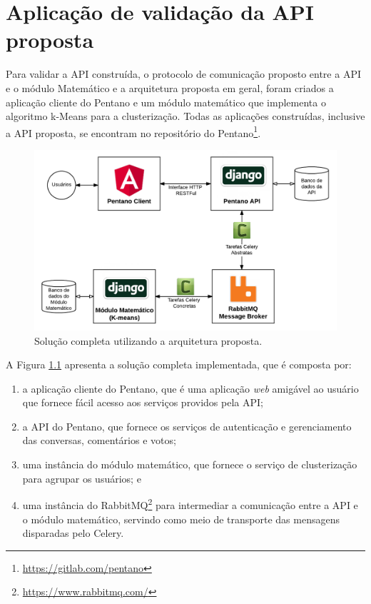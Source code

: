 \chapter{Aplicação de validação da API proposta} \label{cap:aplicacao_exemplo}

  Para validar a API construída, o protocolo de comunicação proposto entre a API e o módulo Matemático
  e a arquitetura proposta em geral, foram criados a aplicação cliente do Pentano e um módulo matemático
  que implementa o algoritmo k-Means para a clusterização.
  Todas as aplicações construídas, inclusive a API proposta, se encontram no repositório do Pentano\footnote{\href{https://gitlab.com/pentano}{https://gitlab.com/pentano}}.
  
  \begin{figure}[h!]
    \centering
    \includegraphics[scale=0.4]{figuras/whole_solution.png}
    \caption{Solução completa utilizando a arquitetura proposta.}
    \label{fig:whole_solution}
  \end{figure}
  
  A Figura \ref{fig:whole_solution} apresenta a solução completa implementada, que
  é composta por:
  
  \begin{enumerate}
      \item a aplicação cliente do Pentano, que é uma aplicação \textit{web} amigável ao usuário que fornece 
      fácil acesso aos serviços providos pela API;
      \item a API do Pentano, que fornece os serviços de autenticação e gerenciamento das conversas, comentários e votos; 
      \item uma instância do módulo matemático,
	  que fornece o serviço de clusterização para agrupar os usuários; e
      \item uma instância do RabbitMQ\footnote{\href{https://www.rabbitmq.com/}{https://www.rabbitmq.com/}} para
	  intermediar a comunicação entre a API e o módulo matemático, servindo como meio de transporte das
	  mensagens disparadas pelo Celery.
	  
  \end{enumerate}

